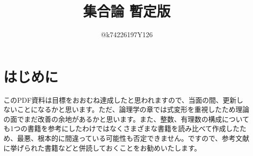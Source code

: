 \documentclass[10pt,a4paper,titlepage]{jsarticle}
\title{集合論 暫定版}
\author{@k74226197Y126}
\begin{document}
\maketitle
{}
\section*{はじめに}
\par
このPDF資料は目標をおおむね達成したと思われますので、当面の間、更新しないことになるかと思います。ただ、論理学の章では式変形を重視したため理論の面でまだ改善の余地があるかと思います。また、整数、有理数の構成についても1つの書籍を参考にしたわけではなくさまざまな書籍を読み比べて作成したため、最悪、根本的に間違っている可能性も否定できません。ですので、参考文献に挙げられた書籍などと併読しておくことをお勧めいたします。\par
{}
\tableofcontents
\clearpage
{}


\clearpage


\clearpage

\clearpage

\clearpage

\clearpage

\clearpage

\clearpage

\clearpage

\clearpage

\clearpage


\clearpage

\clearpage

\end{document}
